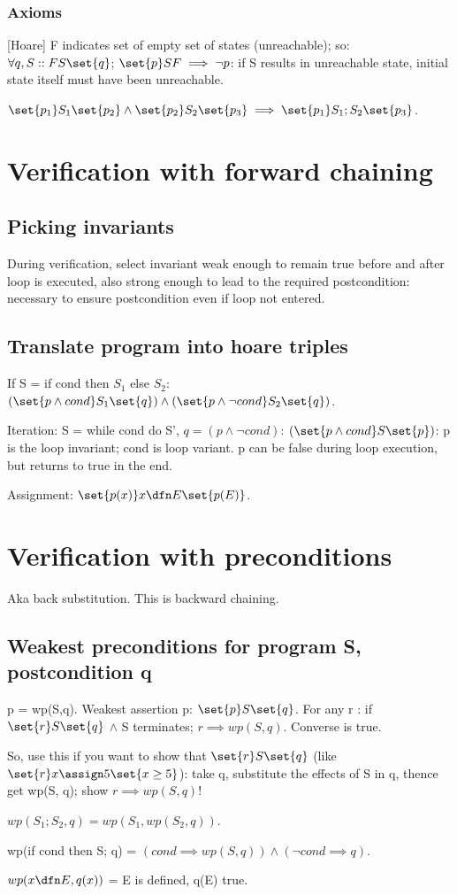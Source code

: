 \documentclass{article}
\begin{document}
\subsubsection{Axioms}
[Hoare] F indicates set of empty set of states (unreachable); so: \\
$\forall q, S:: F S \set{q}$; $\set{p}S F \implies \lnot p $: if S results in unreachable state, initial state itself must have been unreachable.

$\set{p_{1}} S_{1}\set{p_{2}}\land \set{p_{2}} S_{2} \set{p_{3}} \implies \set{p_{1}}S_{1};S_{2}\set{p_{3}}$.

\section{Verification with forward chaining}
\subsection{Picking invariants}
During verification, select invariant weak enough to remain true before and after loop is executed, also strong enough to lead to the required postcondition: necessary to ensure postcondition even if loop not entered.

\subsection{Translate program into hoare triples}
If S = if cond then $S_{1}$ else $S_{2}$: $(\set{p \land cond} S_{1} \set{q})\land (\set{p \land 
 \lnot cond} S_{2} \set{q})$.

Iteration: S = while cond do S', $q = (p \land \lnot cond)$: $(\set{p \land cond} S \set{p})$: p is the loop invariant; cond is loop variant. p can be false during loop execution, but returns to true in the end.

Assignment: $\set{p(x)} x \dfn E \set{p(E)}$.


\section{Verification with preconditions}
Aka back substitution. This is backward chaining.

\subsection{Weakest preconditions for program S, postcondition q}
p = wp(S,q). Weakest assertion p: $\set{p} S \set{q}$. For any r : if $\set{r} S \set{q}$ $\land$ S terminates; $r \implies wp(S,q)$. Converse is true.

So, use this if you want to show that $\set{r} S \set{q}$ (like $\set{r} x \assign 5 \set{x\geq5}$): take q, substitute the effects of S in q, thence get wp(S, q); show $r \implies wp(S, q)$!

$wp(S_{1};S_{2}, q) = wp(S_{1}, wp(S_{2},q))$.

wp(if cond then S; q) = $(cond \implies wp(S,q)) \land (\lnot cond \implies q)$.

$wp(x \dfn E, q(x))$ = E is defined, q(E) true.

% 
% 
\end{document}
